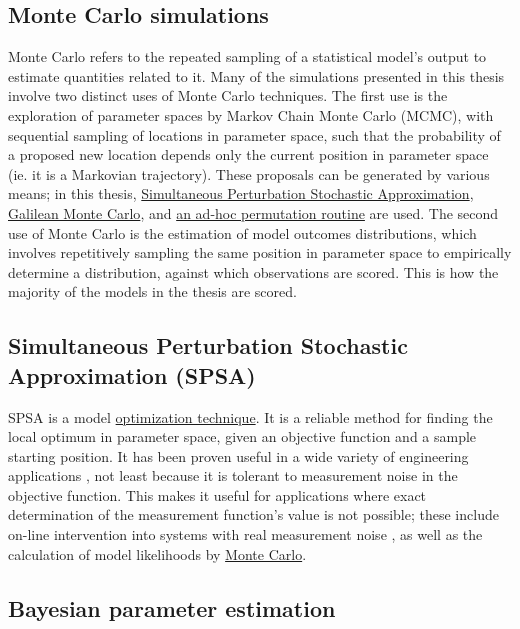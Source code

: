 \subsection{Monte Carlo simulations}
\label{ssec:MonteCarlo}
Monte Carlo refers to the repeated sampling of a statistical model's output to estimate quantities related to it. Many of the simulations presented in this thesis involve two distinct uses of Monte Carlo techniques. The first use is the exploration of parameter spaces by Markov Chain Monte Carlo (MCMC), with sequential sampling of locations in parameter space, such that the probability of a proposed new location depends only the current position in parameter space (ie. it is a Markovian trajectory). These proposals can be generated by various means; in this thesis, \hyperref[ssec:SPSA]{Simultaneous Perturbation Stochastic Approximation}, \hyperref[ssec:GMC]{Galilean Monte Carlo}, and \hyperref[ssec:adhoc]{an ad-hoc permutation routine} are used. The second use of Monte Carlo is the estimation of model outcomes distributions, which involves repetitively sampling the same position in parameter space to empirically determine a distribution, against which observations are scored. This is how the majority of the models in the thesis are scored. 

\subsection{Simultaneous Perturbation Stochastic Approximation (SPSA)}
\label{ssec:SPSA}
SPSA is a model \hyperref[sampleoptim]{optimization technique}. It is a reliable method for finding the local optimum in parameter space, given an objective function and a sample starting position. It has been proven useful in a wide variety of engineering applications \cite{Kleinman1997,Zhou2008}, not least because it is tolerant to measurement noise in the objective function. This makes it useful for applications where exact determination of the measurement function's value is not possible; these include on-line intervention into systems with real measurement noise \cite{Zhou2008}, as well as the calculation of model likelihoods by \hyperref[ssec:MonteCarlo]{Monte Carlo}.

\subsection{Bayesian parameter estimation}
\label{ssec:Bayes}

